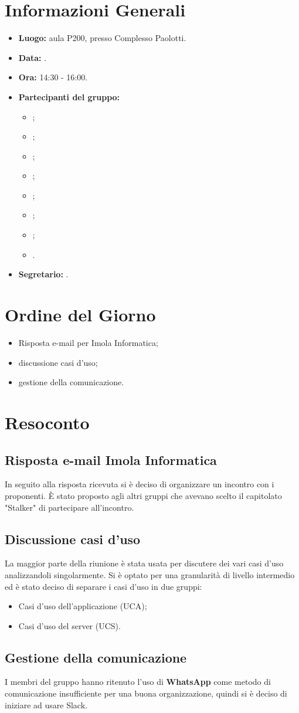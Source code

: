 \section{Informazioni Generali}
\begin{itemize}
\item \textbf{Luogo:} aula P200, presso Complesso Paolotti.
\item \textbf{Data:} \Data.
\item \textbf{Ora:} 14:30 - 16:00.
\item \textbf{Partecipanti del gruppo:}
	\begin{itemize}
		\item \AT; 
		\item \BR;
		\item \CE; 
		\item \DF;
		\item \LD;
		\item \MC;
		\item \PF;
		\item \SE.
	\end{itemize} 
\item \textbf{Segretario:} \DF.
\end{itemize}


\section{Ordine del Giorno}
\begin{itemize}
\item Risposta e-mail per Imola Informatica;
\item discussione casi d'uso;
\item gestione della comunicazione.
\end{itemize}

\section{Resoconto}
\subsection{Risposta e-mail Imola Informatica}
In seguito alla risposta ricevuta si è deciso di organizzare un incontro con i proponenti.
È stato proposto agli altri gruppi che avevano scelto il capitolato "Stalker" di partecipare all'incontro. 

\subsection{Discussione casi d'uso}
La maggior parte della riunione è stata usata per discutere dei vari casi d'uso analizzandoli singolarmente.
Si è optato per una granularità di livello intermedio ed è stato deciso di separare i casi d'uso in due gruppi:
\begin{itemize}
\item Casi d'uso dell'applicazione (UCA);
\item Casi d'uso del server (UCS).
\end{itemize}


\subsection{Gestione della comunicazione}
I membri del gruppo hanno ritenuto l'uso di \textbf{WhatsApp} come metodo di comunicazione insufficiente per una buona organizzazione, quindi si è deciso di iniziare ad usare Slack.

\clearpage